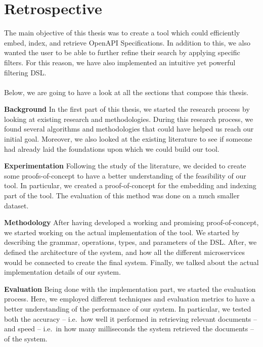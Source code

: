 \section{Retrospective}\label{sec:retrospective}
The main objective of this thesis was to create a tool which could efficiently embed, index, and retrieve OpenAPI Specifications.
In addition to this, we also wanted the user to be able to further refine their search by applying specific filters.
For this reason, we have also implemented an intuitive yet powerful filtering DSL\@. \\ \\
Below, we are going to have a look at all the sections that compose this thesis.

\begin{description}
    \item \textbf{Background} In the first part of this thesis, we started the research process by looking at existing research and methodologies.
    During this research process, we found several algorithms and methodologies that could have helped us reach our initial goal.
    Moreover, we also looked at the existing literature to see if someone had already laid the foundations upon which we could build our tool.
    \item \textbf{Experimentation} Following the study of the literature, we decided to create some proofs-of-concept to have a better understanding of the feasibility of our tool.
    In particular, we created a proof-of-concept for the embedding and indexing part of the tool.
    The evaluation of this method was done on a much smaller dataset.
    \item \textbf{Methodology} After having developed a working and promising proof-of-concept, we started working on the actual implementation of the tool.
    We started by describing the grammar, operations, types, and parameters of the DSL\@.
    After, we defined the architecture of the system, and how all the different microservices would be connected to create the final system.
    Finally, we talked about the actual implementation details of our system.
    \item \textbf{Evaluation} Being done with the implementation part, we started the evaluation process.
    Here, we employed different techniques and evaluation metrics to have a better understanding of the performance of our system.
    In particular, we tested both the accuracy -- i.e.\ how well it performed in retrieving relevant documents -- and speed -- i.e.\ in how many milliseconds the system retrieved the documents -- of the system.
\end{description}
